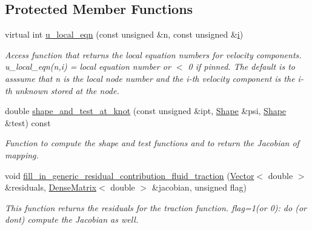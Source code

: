 \subsection*{Protected Member Functions}
\begin{DoxyCompactItemize}
\item 
virtual int \hyperlink{classoomph_1_1NavierStokesImpedanceTractionElement_ac5070c5b06b172cb7f1cb36b853e8edf}{u\+\_\+local\+\_\+eqn} (const unsigned \&n, const unsigned \&\hyperlink{cfortran_8h_adb50e893b86b3e55e751a42eab3cba82}{i})
\begin{DoxyCompactList}\small\item\em Access function that returns the local equation numbers for velocity components. u\+\_\+local\+\_\+eqn(n,i) = local equation number or $<$ 0 if pinned. The default is to asssume that n is the local node number and the i-\/th velocity component is the i-\/th unknown stored at the node. \end{DoxyCompactList}\item 
double \hyperlink{classoomph_1_1NavierStokesImpedanceTractionElement_aa1738496ef280139a8bd1dbda979d8b1}{shape\+\_\+and\+\_\+test\+\_\+at\+\_\+knot} (const unsigned \&ipt, \hyperlink{classoomph_1_1Shape}{Shape} \&psi, \hyperlink{classoomph_1_1Shape}{Shape} \&test) const
\begin{DoxyCompactList}\small\item\em Function to compute the shape and test functions and to return the Jacobian of mapping. \end{DoxyCompactList}\item 
void \hyperlink{classoomph_1_1NavierStokesImpedanceTractionElement_a0ebea8eb00325fda0ff0b4ad38b78dc0}{fill\+\_\+in\+\_\+generic\+\_\+residual\+\_\+contribution\+\_\+fluid\+\_\+traction} (\hyperlink{classoomph_1_1Vector}{Vector}$<$ double $>$ \&residuals, \hyperlink{classoomph_1_1DenseMatrix}{Dense\+Matrix}$<$ double $>$ \&jacobian, unsigned flag)
\begin{DoxyCompactList}\small\item\em This function returns the residuals for the traction function. flag=1(or 0)\+: do (or don\textquotesingle{}t) compute the Jacobian as well. \end{DoxyCompactList}\end{DoxyCompactItemize}
